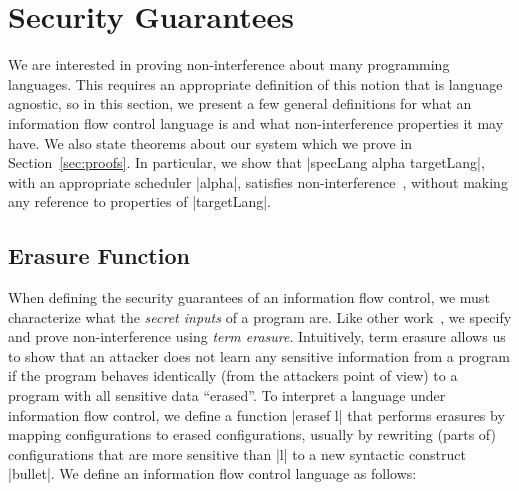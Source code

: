 \section{Security Guarantees}
\label{sec:formal}

We are interested in proving non-interference about many programming
languages.  This requires an appropriate definition of this notion
that is language agnostic, so in this section, we present a few
general definitions for what an information flow control language is
and what non-interference properties it may have.  We also state
theorems about our system which we prove in Section~\ref{sec:proofs}.
In particular, we show that |specLang alpha targetLang|, with an appropriate
scheduler |alpha|, satisfies non-interference~\cite{Goguen82},
without making any reference to properties of |targetLang|.


\subsection{Erasure Function}

When defining the security guarantees of an information flow control,
we must characterize what the \emph{secret inputs} of a program are.  Like
other work~\cite{Li+:2010:arrows,Russo+:Haskell08,lio,stefan:addressing-covert},
we specify and prove non-interference using \emph{term erasure}.
%
Intuitively, term erasure allows us to show that an attacker does not learn
any sensitive information from a program if the program behaves identically
(from the attackers point of view) to a program with all sensitive data
``erased''.
%
To interpret a language under information flow control, we define a function |erasef l| that
performs erasures by mapping configurations to erased configurations,
usually by rewriting (parts of) configurations that are more sensitive
than |l| to a new syntactic construct |bullet|.  We define
an information flow control language as follows:

